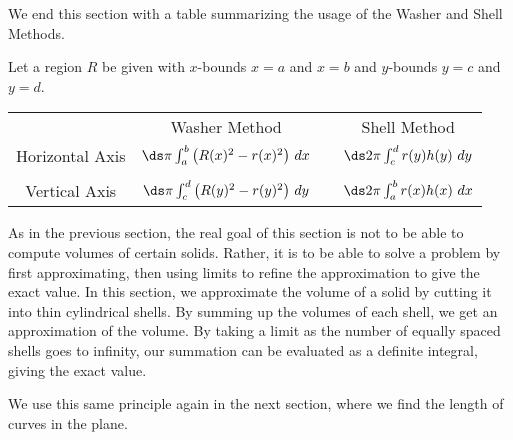 We end this section with a table summarizing the usage of the Washer and Shell Methods.

{Let a region $R$ be given with $x$-bounds $x=a$ and $x=b$ and $y$-bounds $y=c$ and $y=d$.
\vskip 5pt
\begin{tabular}{cccc}
 		& Washer Method & & Shell Method \rule[-10pt]{0pt}{10pt} \\
 \parbox{50pt}{\centering Horizontal Axis}  & $\ds \pi\int_a^b \big(R(x)^2-r(x)^2\big)\ dx$ & & $\ds 2\pi\int_c^d r(y)h(y)\ dy$ \\ \\
 \parbox{40pt}{\centering Vertical Axis} &  $\ds\pi \int_c^d\big(R(y)^2-r(y)^2\big)\ dy$ & & $\ds 2\pi\int_a^b r(x)h(x)\ dx$
 \end{tabular}
 }
 
As in the previous section, the real goal of this section is not to be able to compute volumes of certain solids. Rather, it is to be able to solve a problem by first approximating, then using limits to refine the approximation to give the exact value. In this section, we approximate the volume of a solid by cutting it into thin cylindrical shells. By summing up the volumes of each shell, we get an approximation of the volume. By taking a limit as the number of equally spaced shells goes to infinity, our summation can be evaluated as a definite integral, giving the exact value.

We use this same principle again in the next section, where we find the length of curves in the plane.
